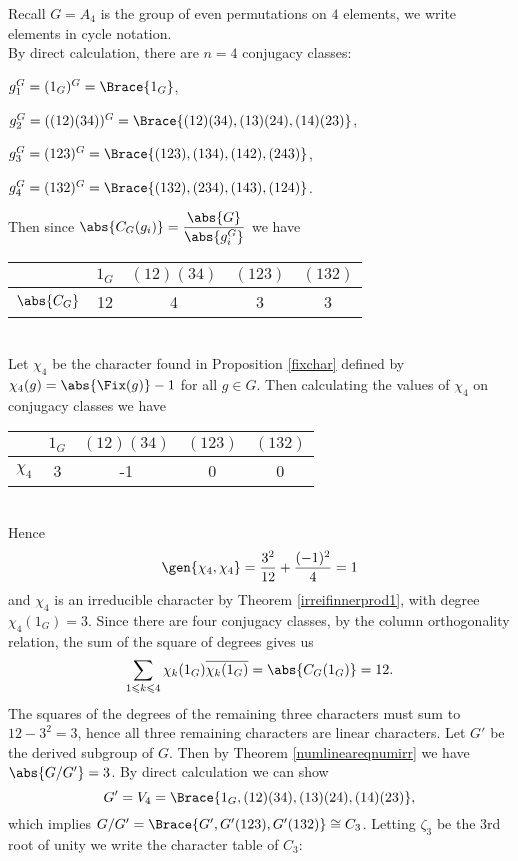 \documentclass[../Project.tex]{subfiles}
\begin{document}
\begin{exam}
	Recall $G = A_4$ is the group of even permutations on $4$ elements, we write elements in cycle notation.\\

	By direct calculation, there are $n = 4$ conjugacy classes:
	\begin{mitem}
		\item $g_1^G = (1_G)^G = \Brace{1_G}$,
		\item $g_2^G = ((12)(34))^G = \Brace{(12)(34),(13)(24),(14)(23)}$,
		\item $g_3^G = (123)^G  = \Brace{(123),(134),(142),(243)}$,
		\item $g_4^G = (132)^G = \Brace{(132),(234),(143),(124)}$.
	\end{mitem}
	Then since $\abs{C_G(g_i)} = \dfrac{\abs{G}}{\abs{g_i^G}}$ we have\\

	\begin{minipage}{\linewidth}
	\centering
	\begin{tabular}{c | c  c  c  c }
		  $ $ & $1_{G}$ & $(12)(34)$ & $(123)$ & $(132)$\\
	\hline
		$\abs{C_{G}}$ & 12 & 4 & 3 & 3 \\
	\hline
	\end{tabular}
	\end{minipage}\\

Let $\chi_4$ be the character found in Proposition \ref{fixchar} defined by $\chi_4(g) = \abs{\Fix(g)} - 1$ for all $g \in G$. Then calculating the values of $\chi_4$ on conjugacy classes we have

\begin{minipage}{\linewidth}
	\centering
	\begin{tabular}{c | c  c  c  c }
		  $ $ & $1_{G}$ & $(12)(34)$ & $(123)$ & $(132)$\\
	\hline
		$\chi_4$ & 3 & -1 & 0 & 0 \\
	\hline
	\end{tabular}
	\end{minipage}\\

Hence
$$\gen{\chi_4,\chi_4} = \frac{3^2}{12} + \frac{(-1)^2}{4} = 1$$
and $\chi_4$ is an irreducible character by Theorem \ref{irreifinnerprod1}, with degree $\chi_4(1_G) = 3$. Since there are four conjugacy classes, by the column orthogonality relation, the sum of the square of degrees gives us
$$\sum_{1 \leqslant k \leqslant 4}\chi_k(1_G)\overline{\chi_k(1_G)} = \abs{C_G(1_G)} = 12.$$
The squares of the degrees of the remaining three characters must sum to $12 - 3^2 = 3$, hence all three remaining characters are linear characters. Let $G'$ be the derived subgroup of $G$. Then by Theorem \ref{numlineareqnumirr} we have $\abs{G/G'} = 3$. By direct calculation we can show
$$G' = V_4 = \Brace{1_G,(12)(34),(13)(24),(14)(23)},$$
which implies $G/G' = \Brace{G',G'(123),G'(132)} \cong C_3$. Letting  $\zeta_3$ be the $3$rd root of unity we write the character table of $C_3$:\\


\end{exam}
\end{document}
